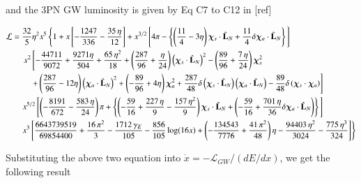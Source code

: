 \documentclass[prd,preprintnumbers,twocolumn,eqsecnum,floatfix,letter]{revtex4}
\begin{document}
and the 3PN GW luminosity is given by Eq C7 to C12 in [ref]
\begin{widetext}
	\begin{align}\label{eq:F}
\mathcal{L} &=\frac{32}{5}\eta^2x^5\left\{1 + x\left[-\frac{1247}{336}-\frac{35\,\eta}{12}\right] + x^{3/2}\left[4\pi-\left\{\left(\frac{11}{4}-3\eta\right)\bm{\chi}_s \cdot \hat{\mathbf{L}}_N +\frac{11}{4}\delta\bm{\chi}_a \cdot \hat{\mathbf{L}}_N\right\}\right.\right]\nonumber\\
&\quad \left.\left. x^2\left[-\frac{44711}{9072}+\frac{9271\eta}{504}+\frac{65\, \eta^2}{18} + \left(\frac{287}{96} +\frac{\eta}{24}\right)\left(\bm{\chi}_s \cdot \hat{\mathbf{L}}_N\right)^2-\left(\frac{89}{96}+\frac{7\,\eta}{24}\right)\bm{\chi}_s^2\right.\right.\right.\nonumber\\
&\qquad\left.\left.\left. + \left(\frac{287}{96}-12\eta\right)\left(\bm{\chi}_a \cdot \hat{\mathbf{L}}_N\right)^2 + \left(-\frac{89}{96}+4\eta\right)\bm{\chi}_a^2 + \frac{287}{48}\delta\left(\bm{\chi}_s \cdot \hat{\mathbf{L}}_N\right)\left(\bm{\chi}_a \cdot \hat{\mathbf{L}}_N\right) -\frac{89}{48}\delta\left(\bm{\chi}_s \cdot \bm{\chi}_a\right)
\right]\right.\right.\nonumber\\
&\quad \left.x^{5/2}\left[\left(-\frac{8191}{672}-\frac{583\,\eta}{24}\right)\pi+\left\{\left(-\frac{59}{16}+\frac{227\, \eta}{9}-\frac{157\, \eta^2}{9}\right)\bm{\chi}_s \cdot \hat{\mathbf{L}}_N + \left(-\frac{59}{16} + \frac{701\,\eta}{36}\delta\bm{\chi}_a \cdot \hat{\mathbf{L}}_N\right)\right\}\right.\right]\nonumber\\
& \left. \quad x^3\left[\frac{6643739519}{69854400}+\frac{16\,\pi^2}{3}-\frac{1712\,\gamma_E}{105}-\frac{856}{105}\log(16x)+\left(-\frac{134543}{7776}+\frac{41\,\pi^2}{48}\right)\eta -\frac{94403\,\eta^2}{3024}-\frac{775\,\eta^3}{324}
\right]
\right\}
	\end{align}
\end{widetext}
Substituting the above two equation into $\dot{x}=-\mathcal{L}_{GW}/(dE/dx)$, we get the following result 
\end{document}
